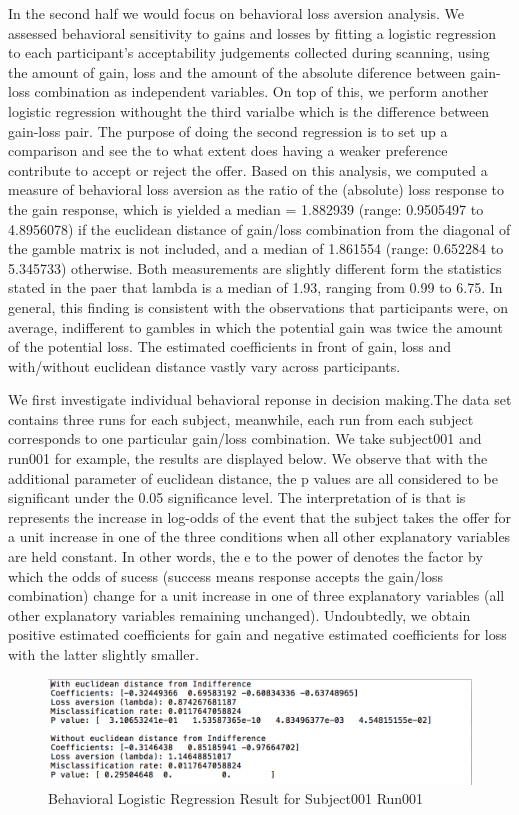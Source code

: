 \par \indent In the second half we would focus on behavioral loss aversion
analysis. We assessed behavioral sensitivity to gains and losses by fitting a
logistic regression to each participant's acceptability judgements collected 
during scanning, using the amount of gain, loss and the amount of the absolute 
diference between gain-loss combination as independent variables. On top of
this, we perform another logistic regression withought the third varialbe which 
is the difference between gain-loss pair. The purpose of doing the second
regression is to set up a comparison and see the to what extent does  having a 
weaker preference contribute to accept or reject the offer. Based on this 
analysis, we computed a measure of behavioral loss aversion \lambda as the ratio
of the (absolute) loss response to the gain response, which is yielded a median
\lambda = 1.882939 (range: 0.9505497 to 4.8956078) if the euclidean distance of 
gain/loss combination from the diagonal of the gamble matrix is not included, 
and a median of 1.861554 (range: 0.652284 to 5.345733) otherwise. Both
measurements are slightly different form the statistics stated in the paer that
lambda is a median of 1.93, ranging from 0.99 to 6.75. In general, this finding
is consistent with the observations that participants were, on average,
indifferent to gambles in which the potential gain was twice the amount of the 
potential loss. The estimated coefficients in front of gain, loss and 
with/without euclidean distance vastly vary across participants. 
    
\par \indent We first investigate individual behavioral reponse in decision 
making.The data set contains three runs for each subject, meanwhile, each run 
from each subject corresponds to one particular gain/loss combination. We take 
subject001 and run001 for example, the results are displayed below. We observe 
that with the additional parameter of euclidean distance, the p values are all 
considered
to be significant under the 0.05 significance level. The interpretation of \beta
is that is represents the increase in log-odds of the event that the subject 
takes the offer for a unit increase in one of the three conditions when all 
other explanatory variables are held constant. In other words, the e to the 
power of \beta denotes the factor by which the odds of sucess (success means
response accepts the gain/loss combination) change for a unit increase in one
of three explanatory variables (all other explanatory variables remaining 
unchanged). Undoubtedly, we obtain positive estimated coefficients for gain and
negative estimated coefficients for loss with the latter slightly smaller. 

\begin {figure}[!ht]
\centering
\includegraphics[width=120mm]{images/Sub001Run001.png}
\caption{Behavioral Logistic Regression Result for Subject001 Run001}
\label{fig:Logistic Regression}
\end{figure}

